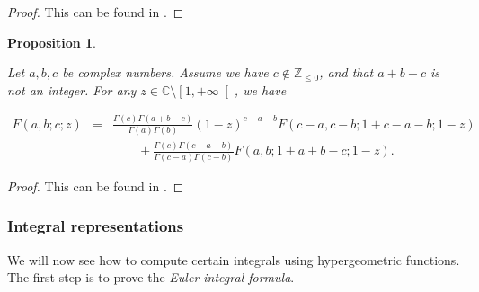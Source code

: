 \documentclass{jams-l}
\newtheorem{proposition}[theorem]{Proposition}
\theoremstyle{definition}
\theoremstyle{remark}
\numberwithin{equation}{section}
\begin{document}
            \begin{proof}
            
                This can be found in \cite[Sec. 5.10.3]{MR1429619}.
            
            \end{proof}
            
            \begin{proposition}
            \label{PropTransformationLinear}
            
                Let $a, b, c$ be complex numbers. Assume we have $c \not \in \mathbb{Z}_{\leqslant 0}$, and that $a + b - c$ is not an integer. For any $z \in \mathbb{C} \setminus \left[ 1, + \infty \right[$, we have
                
                \[ \begin{array}{lll}
                        F \left( a, b; c; z \right) & = & \frac{\Gamma \left( c \right) \Gamma \left( a + b - c \right)}{\Gamma \left( a \right) \Gamma \left( b \right)} \left( 1 - z \right)^{c - a - b} F \left( c - a, c - b; 1 + c - a - b; 1 - z \right) \\[1em]
                        
                        && \qquad + \frac{\Gamma \left( c \right) \Gamma \left( c - a - b \right)}{\Gamma \left( c - a \right) \Gamma \left( c - b \right)} F \left( a, b; 1 + a + b - c; 1 - z \right).
                    \end{array} \]
            
            \end{proposition}
            
            \begin{proof}
            
                This can be found in \cite[Sec. 5.10.4]{MR1429619}.
            
            \end{proof}
            
            
        \subsubsection{Integral representations}
        
            We will now see how to compute certain integrals using hypergeometric functions. The first step is to prove the \textit{Euler integral formula}.
        
\end{document}
